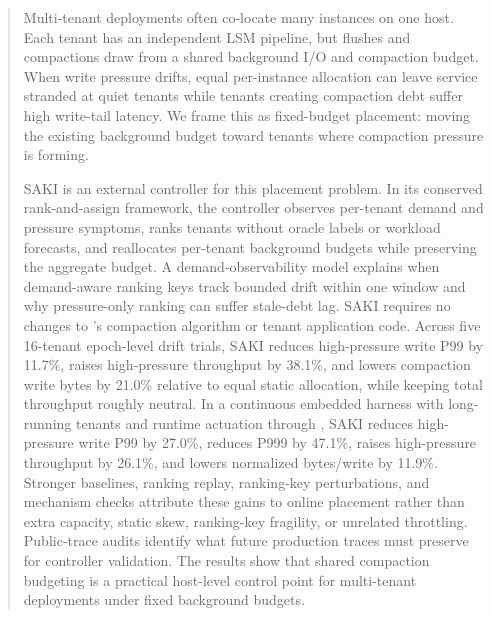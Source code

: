 \begin{abstract}
Multi-tenant deployments often co-locate many \rocksdb instances on one host.
Each tenant has an independent LSM pipeline, but flushes and compactions draw
from a shared background I/O and compaction budget. When write pressure drifts,
equal per-instance allocation can leave service stranded at quiet tenants while
tenants creating compaction debt suffer high write-tail latency. We frame this
as fixed-budget placement: moving the existing background budget toward tenants
where compaction pressure is forming.

SAKI is an external controller for this placement problem. In its conserved
rank-and-assign framework, the controller observes per-tenant demand and
pressure symptoms, ranks tenants without oracle labels or workload forecasts,
and reallocates per-tenant background budgets while preserving the aggregate
budget. A demand-observability model explains when demand-aware ranking keys
track bounded drift within one window and why pressure-only ranking can suffer
stale-debt lag. SAKI requires no changes to \rocksdb's compaction algorithm or
tenant application code. Across five
16-tenant epoch-level drift trials, SAKI reduces high-pressure write P99 by
11.7\%, raises high-pressure throughput by 38.1\%, and lowers compaction write
bytes by 21.0\% relative to equal static allocation, while keeping total
throughput roughly neutral. In a continuous embedded \rocksdb harness with
long-running tenants and runtime actuation through \ratecall, SAKI reduces
high-pressure write P99 by 27.0\%, reduces P999 by 47.1\%, raises
high-pressure throughput by 26.1\%, and lowers normalized bytes/write by
11.9\%. Stronger baselines, ranking replay, ranking-key perturbations, and
mechanism checks attribute these gains to online placement rather than extra
capacity, static skew, ranking-key fragility, or unrelated throttling. Public-trace
audits identify what future production traces must preserve for controller
validation. The results show that shared
compaction budgeting is a practical host-level control point for multi-tenant
\rocksdb deployments under fixed background budgets.
\end{abstract}
